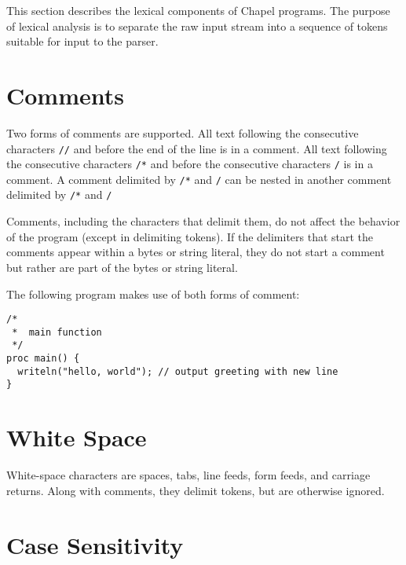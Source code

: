 \label{Lexical_Structure}

This section describes the lexical components of Chapel programs.
The purpose of lexical analysis is
to separate the raw input stream into a sequence of tokens suitable
for input to the parser.

\section{Comments}
\label{Comments}

Two forms of comments are supported.  All text following the
consecutive characters {\tt //} and before the end of the line is in a
comment.  All text following the consecutive characters {\tt /*} and
before the consecutive characters {\tt */} is in a comment.
A comment delimited by {\tt /*} and {\tt */} can be nested in
another comment delimited by {\tt /*} and {\tt */}

Comments, including the characters that delimit them, do not affect
the behavior of the program (except in delimiting tokens).  If the
delimiters that start the comments appear within a bytes or string literal,
they do not start a comment but rather are part of the bytes or string literal.

\begin{example}
The following program makes use of both forms of comment:
\begin{chapel}
\begin{verbatim}
/*
 *  main function
 */
proc main() {
  writeln("hello, world"); // output greeting with new line
}
\end{verbatim}
\end{chapel}
\end{example}

\section{White Space}
\label{White_Space}

White-space characters are spaces, tabs, line feeds, form feeds, and carriage
returns.  Along with comments, they delimit tokens, but are otherwise
ignored.

\section{Case Sensitivity}
\label{Case_Sensitivity}

